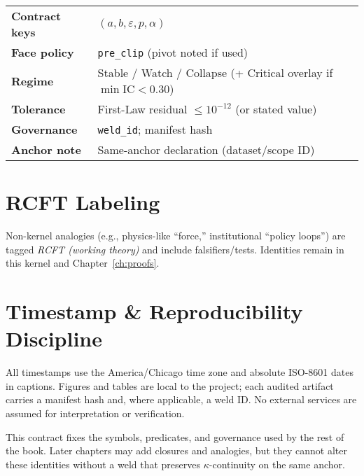 \begin{eqbox}
\small
\begin{tabularx}{\linewidth}{@{}>{\bfseries}l X@{}}
Contract keys & $(a,b,\varepsilon,p,\alpha)$ \\
Face policy   & \texttt{pre\_clip} (pivot noted if used) \\
Regime        & Stable / Watch / Collapse (+ Critical overlay if $\min\mathrm{IC}<0.30$) \\
Tolerance     & First-Law residual $\le 10^{-12}$ (or stated value) \\
Governance    & \texttt{weld\_id}; manifest hash \\
Anchor note   & Same-anchor declaration (dataset/scope ID) \\
\end{tabularx}
\end{eqbox}

\section{RCFT Labeling}
\label{sec:contract-rcft}
Non-kernel analogies (e.g., physics-like “force,” institutional “policy loops”) are tagged \emph{RCFT (working theory)} and include falsifiers/tests. Identities remain in this kernel and Chapter~\ref{ch:proofs}.

\section{Timestamp \& Reproducibility Discipline}
\label{sec:contract-time}
All timestamps use the America/Chicago time zone and absolute ISO-8601 dates in captions. Figures and tables are local to the project; each audited artifact carries a manifest hash and, where applicable, a weld ID. No external services are assumed for interpretation or verification.

\medskip
\noindent
This contract fixes the symbols, predicates, and governance used by the rest of the book. Later chapters may add closures and analogies, but they cannot alter these identities without a weld that preserves $\kappa$-continuity on the same anchor.
